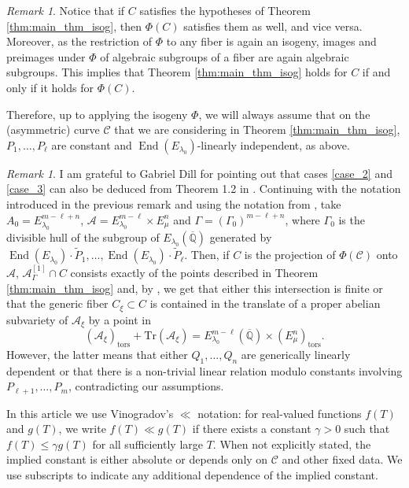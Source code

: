 \documentclass[11pt,a4paper,reqno]{amsart}
\numberwithin{equation}{section}
\newcommand{\Qal}{\overline{\mathbb{Q}}}
\renewcommand{\c}{\mathcal{C}}
\renewcommand{\l}{\lambda}
\newcommand{\m}{\mu}
\newcommand{\pq}[1]{\left[ #1 \right]}
\DeclareMathOperator{\en}{End}
\theoremstyle{remark}
\newtheorem{remark}[theorem]{Remark}
\theoremstyle{definition}
\theoremstyle{definition}
\begin{document}
\begin{remark}
Notice that if $C$ satisfies the hypotheses of Theorem \ref{thm:main_thm_isog}, then $\Phi(C)$ satisfies them as well, and vice versa. Moreover, as the restriction of $\Phi$ to any fiber is again an isogeny, images and preimages under $\Phi$ of algebraic subgroups of a fiber are again algebraic subgroups. This implies that Theorem \ref{thm:main_thm_isog} holds for $C$ if and only if it holds for $\Phi(C)$.

Therefore, up to applying the isogeny $\Phi$, we will always assume that on the (asymmetric) curve $\c$ that we are considering in Theorem \ref{thm:main_thm_isog}, $P_1, \ldots, P_{\ell}$ are constant and $\en(E_{\l_0})$-linearly independent, as above.
\end{remark}

\begin{remark}
I am grateful to Gabriel Dill for pointing out that cases \ref{case_2} and \ref{case_3} can also be deduced from Theorem 1.2 in \cite{Dil21}. 
Continuing with the notation introduced in the previous remark and using the notation from \cite{Dil21}, take $A_0=E_{\l_0}^{m-\ell+n}$, $\mathcal{A}=E_{\l_0}^{m-\ell} \times E_{\m}^n$ and $\Gamma=(\Gamma_0)^{m-\ell+n}$, where $\Gamma_0$ is the divisible hull of the subgroup of $E_{\l_0}(\Qal)$ generated by $\en(E_{\l_0})\cdot \widetilde{P}_1, \ldots, \en(E_{\l_0})\cdot \widetilde{P}_{\ell}$. 
Then, if $C$ is the projection of $\Phi(\c)$ onto $\mathcal{A}$, $\mathcal{A}_{\Gamma}^{\pq{1}} \cap C$ consists exactly of the points described in Theorem \ref{thm:main_thm_isog} and, by \cite[Theorem 1.2]{Dil21}, we get that either this intersection is finite or that the generic fiber $C_{\xi} \subset C$ is contained in the translate of a proper abelian subvariety of $\mathcal{A}_{\xi}$ by a point in 
$$(\mathcal{A}_{\xi})_{\mathrm{tors}}+ \mathrm{Tr}(\mathcal{A}_{\xi})=E_{\l_0}^{m-\ell}(\Qal) \times (E_{\m}^n)_{\mathrm{tors}}.$$ 
However, the latter means that either $Q_1, \ldots, Q_n$ are generically linearly dependent or that there is a non-trivial linear relation modulo constants involving $P_{\ell+1}, \ldots, P_m$, contradicting our assumptions. 
\end{remark}

In this article we use Vinogradov's $\ll$ notation: for real-valued functions $f(T)$ and $g(T)$, we write $f(T) \ll g(T)$ if there exists a constant $\gamma > 0$ such that $f(T) \leq \gamma g(T)$ for all sufficiently large $T$. When not explicitly stated, the implied constant is either absolute or depends only on $\mathcal{C}$ and other fixed data. We use subscripts to indicate any additional dependence of the implied constant. 
\end{document}
